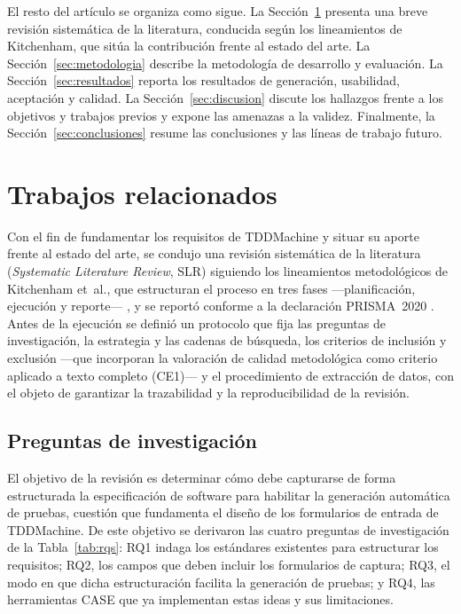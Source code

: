 \documentclass[10pt,journal,twoside,letterpaper]{IEEEtran}
\begin{document}
	El resto del artículo se organiza como sigue. La Sección~\ref{sec:trabajos} presenta una breve revisión sistemática de la literatura, conducida según los lineamientos de Kitchenham, que sitúa la contribución frente al estado del arte. La Sección~\ref{sec:metodologia} describe la metodología de desarrollo y evaluación. La Sección~\ref{sec:resultados} reporta los resultados de generación, usabilidad, aceptación y calidad. La Sección~\ref{sec:discusion} discute los hallazgos frente a los objetivos y trabajos previos y expone las amenazas a la validez. Finalmente, la Sección~\ref{sec:conclusiones} resume las conclusiones y las líneas de trabajo futuro.
	
	\section{Trabajos relacionados}
	\label{sec:trabajos}
	
	Con el fin de fundamentar los requisitos de TDDMachine y situar su aporte frente al estado del arte, se condujo una revisión sistemática de la literatura (\emph{Systematic Literature Review}, SLR) siguiendo los lineamientos metodológicos de Kitchenham et~al., que estructuran el proceso en tres fases ---planificación, ejecución y reporte--- \cite{kitchenham2009slr}, y se reportó conforme a la declaración PRISMA~2020 \cite{prisma2020}. Antes de la ejecución se definió un protocolo que fija las preguntas de investigación, la estrategia y las cadenas de búsqueda, los criterios de inclusión y exclusión ---que incorporan la valoración de calidad metodológica como criterio aplicado a texto completo (CE1)--- y el procedimiento de extracción de datos, con el objeto de garantizar la trazabilidad y la reproducibilidad de la revisión.
	
	\subsection{Preguntas de investigación}
	\label{subsec:rqs}
	
	El objetivo de la revisión es determinar cómo debe capturarse de forma estructurada la especificación de software para habilitar la generación automática de pruebas, cuestión que fundamenta el diseño de los formularios de entrada de TDDMachine. De este objetivo se derivaron las cuatro preguntas de investigación de la Tabla~\ref{tab:rqs}: RQ1 indaga los estándares existentes para estructurar los requisitos; RQ2, los campos que deben incluir los formularios de captura; RQ3, el modo en que dicha estructuración facilita la generación de pruebas; y RQ4, las herramientas CASE que ya implementan estas ideas y sus limitaciones.
	
\end{document}

